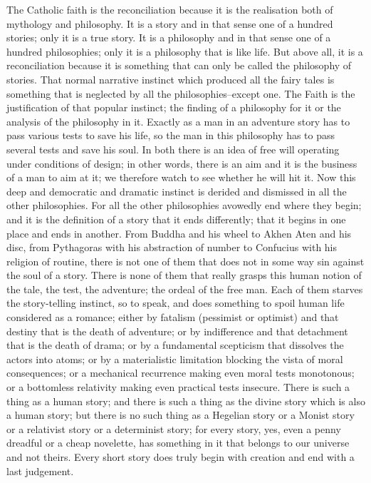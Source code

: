 The Catholic faith is the reconciliation because it is the realisation both of mythology and philosophy. It is a story and in that sense one of a hundred stories; only it is a true story. It is a philosophy and in that sense one of a hundred philosophies; only it is a philosophy that is like life. But above all, it is a reconciliation because it is something that can only be called the philosophy of stories. That normal narrative instinct which produced all the fairy tales is something that is neglected by all the philosophies--except one. The Faith is the justification of that popular instinct; the finding of a philosophy for it or the analysis of the philosophy in it. Exactly as a man in an adventure story has to pass various tests to save his life, so the man in this philosophy has to pass several tests and save his soul. In both there is an idea of free will operating under conditions of design; in other words, there is an aim and it is the business of a man to aim at it; we therefore watch to see whether he will hit it. Now this deep and democratic and dramatic instinct is derided and dismissed in all the other philosophies. For all the other philosophies avowedly end where they begin; and it is the definition of a story that it ends differently; that it begins in one place and ends in another. From Buddha and his wheel to Akhen Aten and his disc, from Pythagoras with his abstraction of number to Confucius with his religion of routine, there is not one of them that does not in some way sin against the soul of a story. There is none of them that really grasps this human notion of the tale, the test, the adventure; the ordeal of the free man. Each of them starves the story-telling instinct, so to speak, and does something to spoil human life considered as a romance; either by fatalism (pessimist or optimist) and that destiny that is the death of adventure; or by indifference and that detachment that is the death of drama; or by a fundamental scepticism that dissolves the actors into atoms; or by a materialistic limitation blocking the vista of moral consequences; or a mechanical recurrence making even moral tests monotonous; or a bottomless relativity making even practical tests insecure. There is such a thing as a human story; and there is such a thing as the divine story which is also a human story; but there is no such thing as a Hegelian story or a Monist story or a relativist story or a determinist story; for every story, yes, even a penny dreadful or a cheap novelette, has something in it that belongs to our universe and not theirs. Every short story does truly begin with creation and end with a last judgement.

